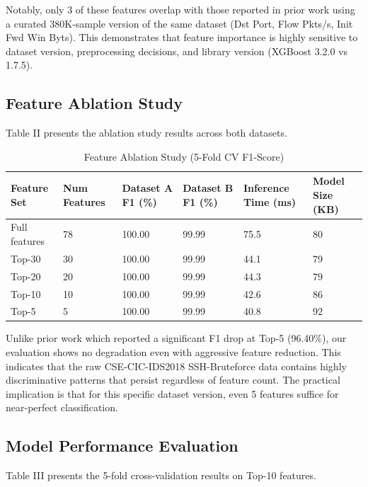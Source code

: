 \documentclass[conference]{IEEEtran}
\begin{document}
Notably, only 3 of these features overlap with those reported in prior work using a curated 380K-sample version of the same dataset (Dst Port, Flow Pkts/s, Init Fwd Win Byts). This demonstrates that feature importance is highly sensitive to dataset version, preprocessing decisions, and library version (XGBoost 3.2.0 vs 1.7.5).

\subsection{Feature Ablation Study}

Table II presents the ablation study results across both datasets.

\begin{table}[!ht]
\centering
\caption{Feature Ablation Study (5-Fold CV F1-Score)}
\footnotesize
\setlength{\tabcolsep}{3pt}
\begin{tabulary}{\textwidth}{|l|L|L|L|L|L|}
\hline
\textbf{Feature Set} & \textbf{Num Features} & \textbf{Dataset A F1 (\%)} & \textbf{Dataset B F1 (\%)} & \textbf{Inference Time (ms)} & \textbf{Model Size (KB)} \\
\hline
Full features & 78 & 100.00 & 99.99 & 75.5 & 80 \\
Top-30 & 30 & 100.00 & 99.99 & 44.1 & 79 \\
Top-20 & 20 & 100.00 & 99.99 & 44.3 & 79 \\
Top-10 & 10 & 100.00 & 99.99 & 42.6 & 86 \\
Top-5 & 5 & 100.00 & 99.99 & 40.8 & 92 \\
\hline
\end{tabulary}
\end{table}

Unlike prior work which reported a significant F1 drop at Top-5 (96.40\%), our evaluation shows no degradation even with aggressive feature reduction. This indicates that the raw CSE-CIC-IDS2018 SSH-Bruteforce data contains highly discriminative patterns that persist regardless of feature count. The practical implication is that for this specific dataset version, even 5 features suffice for near-perfect classification.

\subsection{Model Performance Evaluation}

Table III presents the 5-fold cross-validation results on Top-10 features.
\end{document}
